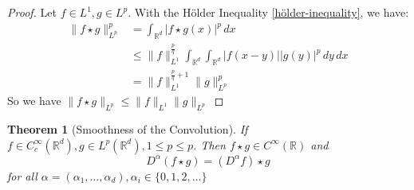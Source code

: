 \documentclass{report}
\theoremstyle{tommy}
\newtheorem{thm}[defn]{Theorem}
\begin{document}
  \begin{proof}
    Let \(f \in L^1, g \in L^p\). With the Hölder Inequality \ref{hölder-inequality}, we have:
    \begin{align*}
      \|f \star g\|_{L^p}^p
      &= \int_{\mathbb{R}^d} |f \star g(x)|^p \, dx \\
      &\le \|f\|_{L^1}^{\frac{p}{q}} \int_{\mathbb{R}^d} \int_{\mathbb{R}^d} |f(x-y)||g(y)|^p \, dy \, dx \\
      &= \| f \|_{L^1}^{\frac{p}{q} + 1} \|g\|_{L^p}^p
    \end{align*}
    So we have \(\| f \star g \|_{L^p} \le \|f\|_{L^1} \|g\|_{L^p}\)
  \end{proof}

  \begin{thm}[Smoothness of the Convolution]
    If \(f \in C_c^\infty(\mathbb{R}^d), g \in L^p(\mathbb{R}^d), 1 \le p \le p\). Then \(f \star g \in C^\infty(\mathbb{R})\) and 
    \[D^\alpha (f\star g) = (D^\alpha f) \star g\]
    for all \(\alpha = (\alpha_1, \dots, \alpha_d), \alpha_i \in \{0, 1, 2, \dots\}\)
  \end{thm}
\end{document}
